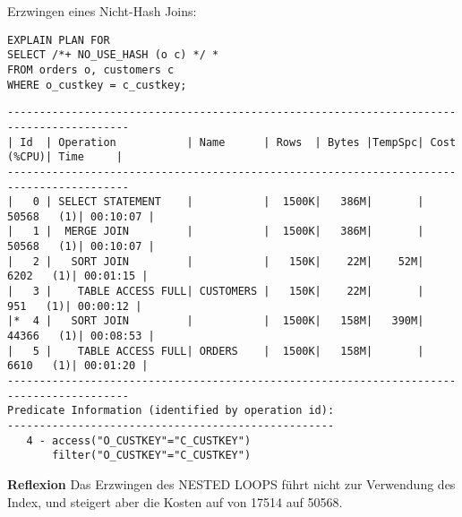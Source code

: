 \documentclass[10pt]{article}
\begin{document}
Erzwingen eines Nicht-Hash Joins:
\begin{lstlisting}[style=sql]
EXPLAIN PLAN FOR
SELECT /*+ NO_USE_HASH (o c) */ *
FROM orders o, customers c
WHERE o_custkey = c_custkey;
\end{lstlisting}
\begin{lstlisting}[style=queryexecutionplan]
-----------------------------------------------------------------------------------------
| Id  | Operation           | Name      | Rows  | Bytes |TempSpc| Cost (%CPU)| Time     |
-----------------------------------------------------------------------------------------
|   0 | SELECT STATEMENT    |           |  1500K|   386M|       | 50568   (1)| 00:10:07 |
|   1 |  MERGE JOIN         |           |  1500K|   386M|       | 50568   (1)| 00:10:07 |
|   2 |   SORT JOIN         |           |   150K|    22M|    52M|  6202   (1)| 00:01:15 |
|   3 |    TABLE ACCESS FULL| CUSTOMERS |   150K|    22M|       |   951   (1)| 00:00:12 |
|*  4 |   SORT JOIN         |           |  1500K|   158M|   390M| 44366   (1)| 00:08:53 |
|   5 |    TABLE ACCESS FULL| ORDERS    |  1500K|   158M|       |  6610   (1)| 00:01:20 |
-----------------------------------------------------------------------------------------
Predicate Information (identified by operation id):
---------------------------------------------------
   4 - access("O_CUSTKEY"="C_CUSTKEY")
       filter("O_CUSTKEY"="C_CUSTKEY")
\end{lstlisting}
\textbf{Reflexion} \newline
Das Erzwingen des NESTED LOOPS führt nicht zur Verwendung des Index, und steigert aber die Kosten auf von 17514 auf 50568.
\end{document}
